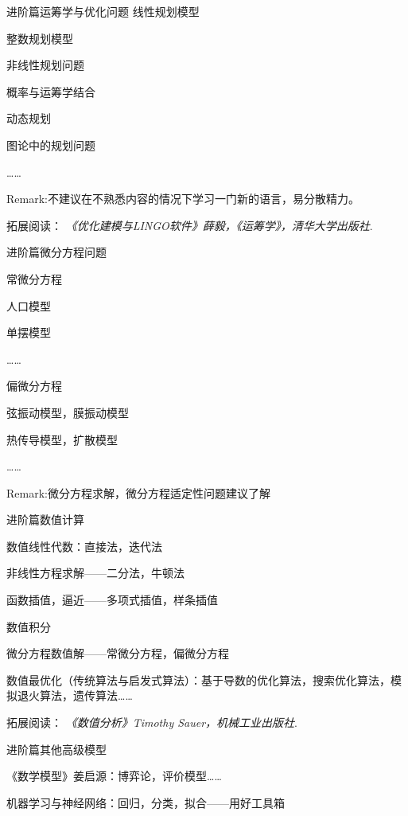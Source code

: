 \documentclass{beamer}
\begin{document}
\begin{frame}{进阶篇}{运筹学与优化问题}
线性规划模型

整数规划模型

非线性规划问题

概率与运筹学结合

动态规划

图论中的规划问题

……


\footnotesize Remark:不建议在不熟悉内容的情况下学习一门新的语言，易分散精力。

\footnotesize 拓展阅读：
\emph{《优化建模与LINGO软件》薛毅，《运筹学》，清华大学出版社}.
\end{frame}


\begin{frame}{进阶篇}{微分方程问题}


\begin{block}{常微分方程}

人口模型

单摆模型

……
\end{block}

\begin{block}{偏微分方程}

弦振动模型，膜振动模型

热传导模型，扩散模型

……
\end{block}


\footnotesize Remark:微分方程求解，微分方程适定性问题建议了解

\end{frame}

\begin{frame}{进阶篇}{数值计算}

数值线性代数：直接法，迭代法

非线性方程求解——二分法，牛顿法

函数插值，逼近——多项式插值，样条插值

数值积分

微分方程数值解——常微分方程，偏微分方程

数值最优化（传统算法与启发式算法）：基于导数的优化算法，搜索优化算法，模拟退火算法，遗传算法……

\footnotesize 拓展阅读：
\emph{《数值分析》Timothy Sauer，机械工业出版社}.
\end{frame}

\begin{frame}{进阶篇}{其他高级模型}

《数学模型》姜启源：博弈论，评价模型……

机器学习与神经网络：回归，分类，拟合——用好工具箱

\end{frame}
\end{document}
